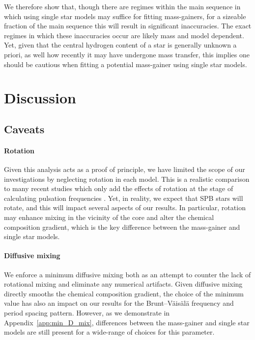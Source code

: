 \documentclass[twocolumn, twocolappendix, oneside]{aastex631}
\newcommand{\bvf}{Brunt–Väisälä frequency\xspace}
\begin{document}
We therefore show that, though there are regimes within the main sequence in which using single star models may suffice for fitting mass-gainers, for a sizeable fraction of the main sequence this will result in significant inaccuracies. The exact regimes in which these inaccuracies occur are likely mass and model dependent. Yet, given that the central hydrogen content of a star is generally unknown a priori, as well how recently it may have undergone mass transfer, this implies one should be cautious when fitting a potential mass-gainer using single star models.

\section{Discussion}

\subsection{Caveats}\label{sec:caveats}
\paragraph{Rotation} Given this analysis acts as a proof of principle, we have limited the scope of our investigations by neglecting rotation in each model. This is a realistic comparison to many recent studies which only add the effects of rotation at the stage of calculating pulsation frequencies \citep[e.g.][]{Michielsen+2021}. Yet, in reality, we expect that SPB stars will rotate, and this will impact several aspects of our results. In particular, rotation may enhance mixing in the vicinity of the core and alter the chemical composition gradient, which is the key difference between the mass-gainer and single star models.

\paragraph{Diffusive mixing} We enforce a minimum diffusive mixing both as an attempt to counter the lack of rotational mixing and eliminate any numerical artifacts. Given diffusive mixing directly smooths the chemical composition gradient, the choice of the minimum value has also an impact on our results for the \bvf and period spacing pattern. However, as we demonstrate in Appendix~\ref{app:min_D_mix}, differences between the mass-gainer and single star models are still present for a wide-range of choices for this parameter.
\end{document}
